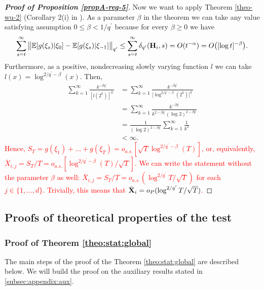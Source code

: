 \begin{proof}[\textnormal{\textbf{Proof of Proposition \ref{propA-reg-5}}}]
Now we want to apply Theorem \ref{theo-wu-2} (Corollary 2(i) in \cite{Wu2007}). As a parameter $\beta$ in the theorem we can take any value satisfying assumption $0 \leq \beta < 1/{q^\prime}$ because for every $\beta \geq 0$ we have 
\begin{align*}
\sum_{s = t}^\infty \big\lVert \mathbb{E} [g(\xi_s)| \xi_0] - \mathbb{E} [g(\xi_s)| \xi_{-1}]\big\lVert_{q^\prime} \leq \sum_{s = t}^\infty \delta_{q^\prime}(\mathbf{H}_i, s) =O(t^{-\alpha}) = O\big([\log t]^{-\beta}\big).
\end{align*}
Furthermore, as a positive, nondecreasing slowly varying function $\mathit{l}$ we can take \linebreak $\mathit{l}(x) = \log^{2/{q^\prime} - \beta}(x)$. Then,
\begin{align*}
\sum_{k=1}^\infty \frac{k^{-\beta q^\prime}}{[l(2^k)]^{q^\prime}} &= \sum_{k=1}^\infty \frac{k^{-\beta  q^\prime}}{\big[\log^{2/{q^\prime} - \beta}(2^k)\big]^{q^\prime}} \\
&= \sum_{k=1}^\infty \frac{k^{-\beta  q^\prime}}{k^{2 -\beta q^\prime }(\log 2)^{2 - \beta q^\prime}} \\
&= \frac{1}{(\log 2)^{2 - \beta q^\prime}}\sum_{k=1}^\infty \frac{1}{k^2} \\
&< \infty.
\end{align*}
\textcolor{red}{Hence, $S_T = g(\xi_1) + \ldots + g(\xi_T) = o_{a.s.}[\sqrt{T}\log^{2/{q^\prime} - \beta}(T)]$, or, equivalently, \linebreak $\bar{X}_{i, j} = S_T/T = o_{a.s.}[\log^{2/{q^\prime} - \beta}(T)/\sqrt{T}]$. We can write the statement without the parameter $\beta$ as well: $\bar{X}_{i, j} = S_T/T = o_{a.s.}(\log^{2/{q^\prime}}{T}/\sqrt{T})$ for each $j \in \{1, \ldots, d\}$. Trivially, this means that $\bar{\mathbf{X}}_i = o_P(\log^{2/{q^\prime}}{T}/\sqrt{T})$.}
\end{proof}


\subsection{Proofs of theoretical properties of the test}
\subsubsection*{Proof of Theorem \ref{theo:stat:global}}\label{subsec-appendix-stat-equality}

The main steps of the proof of the Theorem \ref{theo:stat:global} are described below. We will build the proof on the auxiliary results stated in \ref{subsec:appendix:aux}.
 
